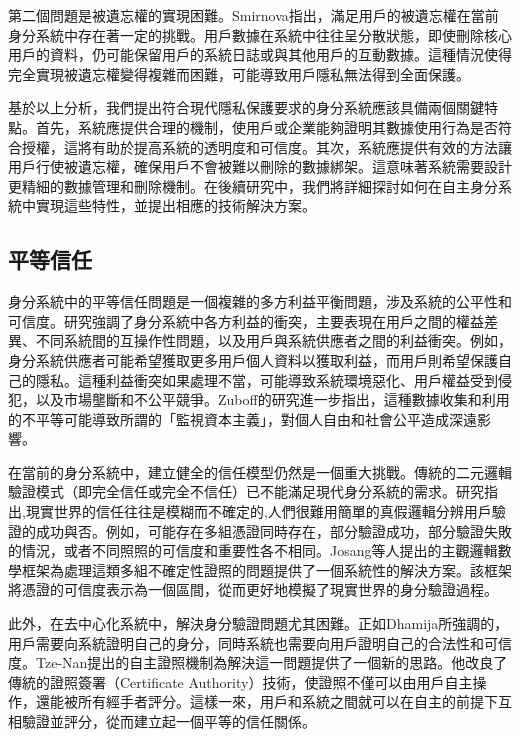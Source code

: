 第二個問題是被遺忘權的實現困難。Smirnova\cite{smirnova2024understanding}指出，滿足用戶的被遺忘權在當前身分系統中存在著一定的挑戰。用戶數據在系統中往往呈分散狀態，即使刪除核心用戶的資料，仍可能保留用戶的系統日誌或與其他用戶的互動數據。這種情況使得完全實現被遺忘權變得複雜而困難，可能導致用戶隱私無法得到全面保護。

基於以上分析，我們提出符合現代隱私保護要求的身分系統應該具備兩個關鍵特點。首先，系統應提供合理的機制，使用戶或企業能夠證明其數據使用行為是否符合授權，這將有助於提高系統的透明度和可信度。其次，系統應提供有效的方法讓用戶行使被遺忘權，確保用戶不會被難以刪除的數據綁架。這意味著系統需要設計更精細的數據管理和刪除機制。在後續研究中，我們將詳細探討如何在自主身分系統中實現這些特性，並提出相應的技術解決方案。
\subsection{平等信任}
身分系統中的平等信任問題是一個複雜的多方利益平衡問題，涉及系統的公平性和可信度。研究\cite{preukschat2021self}強調了身分系統中各方利益的衝突，主要表現在用戶之間的權益差異、不同系統間的互操作性問題，以及用戶與系統供應者之間的利益衝突。例如，身分系統供應者可能希望獲取更多用戶個人資料以獲取利益，而用戶則希望保護自己的隱私。這種利益衝突如果處理不當，可能導致系統環境惡化、用戶權益受到侵犯，以及市場壟斷和不公平競爭。Zuboff\cite{zhang2010security}的研究進一步指出，這種數據收集和利用的不平等可能導致所謂的「監視資本主義」，對個人自由和社會公平造成深遠影響。

在當前的身分系統中，建立健全的信任模型仍然是一個重大挑戰。傳統的二元邏輯驗證模式（即完全信任或完全不信任）已不能滿足現代身分系統的需求。研究\cite{s22155641}指出,現實世界的信任往往是模糊而不確定的,人們很難用簡單的真假邏輯分辨用戶驗證的成功與否。例如，可能存在多組憑證同時存在，部分驗證成功，部分驗證失敗的情況，或者不同照照的可信度和重要性各不相同。Josang等人\cite{josang2006exploring}提出的主觀邏輯數學框架為處理這類多組不確定性證照的問題提供了一個系統性的解決方案。該框架將憑證的可信度表示為一個區間，從而更好地模擬了現實世界的身分驗證過程。

此外，在去中心化系統中，解決身分驗證問題尤其困難。正如Dhamija\cite{dhamija2008sevenflaws}所強調的，用戶需要向系統證明自己的身分，同時系統也需要向用戶證明自己的合法性和可信度。Tze-Nan\cite{NTU202102846}提出的自主證照機制為解決這一問題提供了一個新的思路。他改良了傳統的證照簽署（Certificate Authority）技術，使證照不僅可以由用戶自主操作，還能被所有經手者評分。這樣一來，用戶和系統之間就可以在自主的前提下互相驗證並評分，從而建立起一個平等的信任關係。

